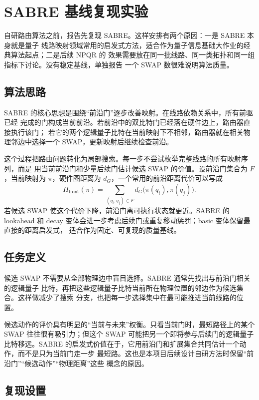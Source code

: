 \section{SABRE 基线复现实验}

自研路由算法之前，报告先复现 SABRE。这样安排有两个原因：一是 SABRE 本身就是量子
线路映射领域常用的启发式方法，适合作为量子信息基础大作业的经典算法起点；二是后续 NPQR 的
效果需要放在同一批线路、同一类拓扑和同一组指标下讨论。没有稳定基线，单独报告
一个 SWAP 数很难说明算法质量。

\subsection{算法思路}

SABRE 的核心思想是围绕“前沿门”逐步改善映射。在线路依赖关系中，所有前驱已经
完成的门构成当前前沿。若前沿中的双比特门已经落在硬件边上，路由器直接执行该门；
若它的两个逻辑量子比特在当前映射下不相邻，路由器就在相关物理邻边中选择一个
SWAP，更新映射后继续检查前沿。

这个过程把路由问题转化为局部搜索。每一步不尝试枚举完整线路的所有映射序列，而是
用当前前沿门和少量后续门估计候选 SWAP 的价值。设前沿门集合为 $F$，当前映射为
$\pi$，硬件图距离为 $d_G$，一个常用的前沿距离代价可以写成
\[
  H_{\mathrm{front}}(\pi)=
  \sum_{(q_i,q_j)\in F} d_G\bigl(\pi(q_i),\pi(q_j)\bigr).
\]
若候选 SWAP 使这个代价下降，前沿门离可执行状态就更近。SABRE 的 lookahead 和
decay 变体会进一步考虑后续门或重复移动惩罚；basic 变体保留最直接的距离启发式，
适合作为固定、可复现的质量基线。

\subsection{任务定义}

候选 SWAP 不需要从全部物理边中盲目选择。SABRE 通常先找出与前沿门相关的逻辑量子
比特，再把这些逻辑量子比特当前所在物理位置的邻边作为候选集合。这样做减少了搜索
分支，也把每一步选择集中在最可能推进当前线路的位置。

候选动作的评价具有明显的“当前与未来”权衡。只看当前门时，最短路径上的某个 SWAP
往往很有吸引力；但这个 SWAP 可能把另一个即将参与后续门的逻辑量子比特移远。SABRE
的启发式价值在于，它用前沿门和扩展集合共同估计一个动作，而不是只为当前门走一步
最短路。这也是本项目后续设计自研方法时保留“前沿门”“候选动作”“物理距离”这些
概念的原因。

\subsection{复现设置}

